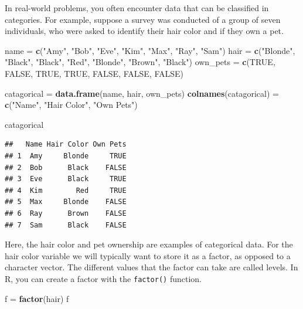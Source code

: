 \documentclass[
]{book}
\newenvironment{Shaded}{\begin{snugshade}}{\end{snugshade}}
\newcommand{\KeywordTok}[1]{\textcolor[rgb]{0.13,0.29,0.53}{\textbf{#1}}}
\newcommand{\NormalTok}[1]{#1}
\newcommand{\OtherTok}[1]{\textcolor[rgb]{0.56,0.35,0.01}{#1}}
\newcommand{\StringTok}[1]{\textcolor[rgb]{0.31,0.60,0.02}{#1}}
\begin{document}
In real-world problems, you often encounter data that can be classified in categories. For example, suppose a survey was conducted of a group of seven individuals, who were asked to identify their hair color and if they own a pet.

\begin{Shaded}
\begin{Highlighting}[]
\NormalTok{name =}\StringTok{ }\KeywordTok{c}\NormalTok{(}\StringTok{"Amy"}\NormalTok{, }\StringTok{"Bob"}\NormalTok{, }\StringTok{"Eve"}\NormalTok{, }\StringTok{"Kim"}\NormalTok{, }\StringTok{"Max"}\NormalTok{, }\StringTok{"Ray"}\NormalTok{, }\StringTok{"Sam"}\NormalTok{)}
\NormalTok{hair =}\StringTok{ }\KeywordTok{c}\NormalTok{(}\StringTok{"Blonde"}\NormalTok{, }\StringTok{"Black"}\NormalTok{, }\StringTok{"Black"}\NormalTok{, }\StringTok{"Red"}\NormalTok{, }\StringTok{"Blonde"}\NormalTok{, }\StringTok{"Brown"}\NormalTok{, }\StringTok{"Black"}\NormalTok{)}
\NormalTok{own_pets =}\StringTok{ }\KeywordTok{c}\NormalTok{(}\OtherTok{TRUE}\NormalTok{, }\OtherTok{FALSE}\NormalTok{, }\OtherTok{TRUE}\NormalTok{, }\OtherTok{TRUE}\NormalTok{, }\OtherTok{FALSE}\NormalTok{, }\OtherTok{FALSE}\NormalTok{, }\OtherTok{FALSE}\NormalTok{)}

\NormalTok{catagorical =}\StringTok{ }\KeywordTok{data.frame}\NormalTok{(name, hair, own_pets)}
\KeywordTok{colnames}\NormalTok{(catagorical) =}\StringTok{ }\KeywordTok{c}\NormalTok{(}\StringTok{"Name"}\NormalTok{, }\StringTok{"Hair Color"}\NormalTok{, }\StringTok{"Own Pets"}\NormalTok{)}

\NormalTok{catagorical}
\end{Highlighting}
\end{Shaded}

\begin{verbatim}
##   Name Hair Color Own Pets
## 1  Amy     Blonde     TRUE
## 2  Bob      Black    FALSE
## 3  Eve      Black     TRUE
## 4  Kim        Red     TRUE
## 5  Max     Blonde    FALSE
## 6  Ray      Brown    FALSE
## 7  Sam      Black    FALSE
\end{verbatim}

Here, the hair color and pet ownership are examples of categorical data. For the hair color variable we will typically want to store it as a factor, as opposed to a character vector. The different values that the factor can take are called levels. In R, you can create a factor with the \texttt{factor()} function.

\begin{Shaded}
\begin{Highlighting}[]
\NormalTok{f =}\StringTok{ }\KeywordTok{factor}\NormalTok{(hair)}
\NormalTok{f}
\end{Highlighting}
\end{Shaded}
\end{document}
